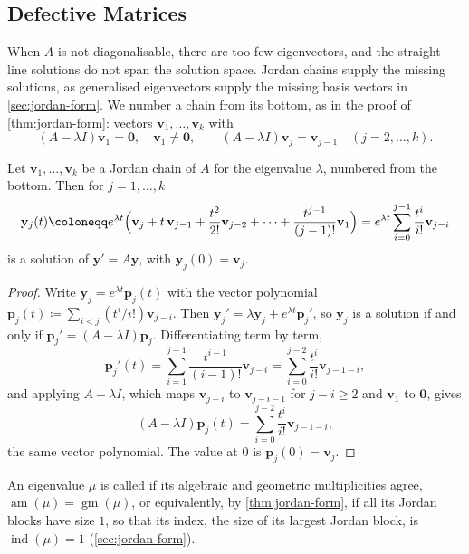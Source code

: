 \subsection{Defective Matrices}

When $A$ is not diagonalisable, there are too few eigenvectors, and the straight-line solutions do not span the solution space. Jordan chains supply the missing solutions, as generalised eigenvectors supply the missing basis vectors in \cref{sec:jordan-form}. We number a chain from its bottom, as in the proof of \cref{thm:jordan-form}: vectors $\mathbf v_1,\ldots,\mathbf v_k$ with
\[
(A-\lambda I)\mathbf v_1=\mathbf 0,\quad\mathbf v_1\ne\mathbf 0,\qquad(A-\lambda I)\mathbf v_j=\mathbf v_{j-1}\quad(j=2,\ldots,k).
\]

\begin{proposition}
\label{prop:chain-solutions}
Let $\mathbf v_1,\ldots,\mathbf v_k$ be a Jordan chain of $A$ for the eigenvalue $\lambda$, numbered from the bottom. Then for $j=1,\ldots,k$
\[
\mathbf y_j(t)\coloneqq e^{\lambda t}\Bigl(\mathbf v_j+t\,\mathbf v_{j-1}+\frac{t^2}{2!}\mathbf v_{j-2}+\cdots+\frac{t^{j-1}}{(j-1)!}\mathbf v_1\Bigr)=e^{\lambda t}\sum_{i=0}^{j-1}\frac{t^i}{i!}\mathbf v_{j-i}
\]
is a solution of $\mathbf y'=A\mathbf y$, with $\mathbf y_j(0)=\mathbf v_j$.
\end{proposition}

\begin{proof}
Write $\mathbf y_j=e^{\lambda t}\mathbf p_j(t)$ with the vector polynomial $\mathbf p_j(t)\coloneqq\sum_{i<j}(t^i/i!)\mathbf v_{j-i}$. Then $\mathbf y_j'=\lambda\mathbf y_j+e^{\lambda t}\mathbf p_j'$, so $\mathbf y_j$ is a solution if and only if $\mathbf p_j'=(A-\lambda I)\mathbf p_j$. Differentiating term by term,
\[
\mathbf p_j'(t)=\sum_{i=1}^{j-1}\frac{t^{i-1}}{(i-1)!}\mathbf v_{j-i}=\sum_{i=0}^{j-2}\frac{t^i}{i!}\mathbf v_{j-1-i},
\]
and applying $A-\lambda I$, which maps $\mathbf v_{j-i}$ to $\mathbf v_{j-i-1}$ for $j-i\ge2$ and $\mathbf v_1$ to $\mathbf 0$, gives
\[
(A-\lambda I)\mathbf p_j(t)=\sum_{i=0}^{j-2}\frac{t^i}{i!}\mathbf v_{j-1-i} ,
\]
the same vector polynomial. The value at $0$ is $\mathbf p_j(0)=\mathbf v_j$.
\end{proof}

An eigenvalue $\mu$ is called  if its algebraic and geometric multiplicities agree, $\operatorname{am}(\mu)=\operatorname{gm}(\mu)$, or equivalently, by \cref{thm:jordan-form}, if all its Jordan blocks have size $1$, so that its index, the size of its largest Jordan block, is $\operatorname{ind}(\mu)=1$ (\cref{sec:jordan-form}).

